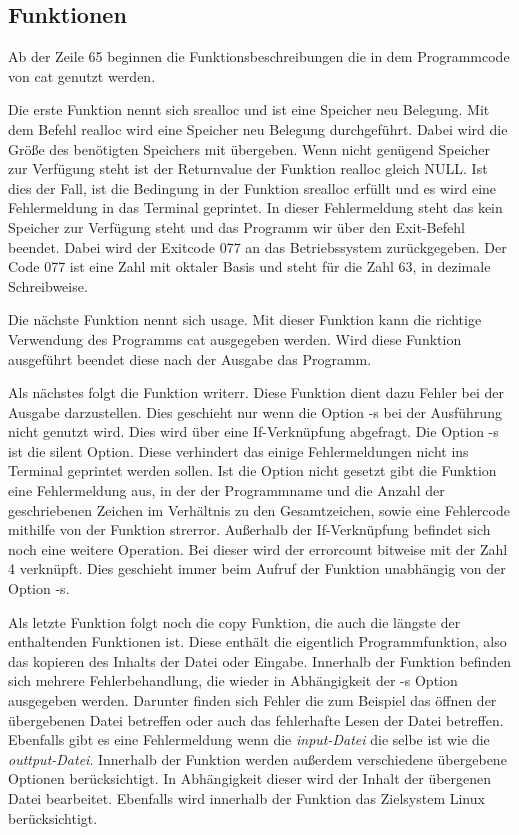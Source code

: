 {\subsection{Funktionen}
Ab der Zeile 65 beginnen die Funktionsbeschreibungen die in dem Programmcode von cat genutzt werden.\par
Die erste Funktion nennt sich srealloc und ist eine Speicher neu Belegung. Mit dem Befehl realloc wird eine Speicher neu Belegung durchgeführt.
Dabei wird die Größe des benötigten Speichers mit übergeben.
Wenn nicht genügend Speicher zur Verfügung steht ist der Returnvalue der Funktion realloc gleich NULL.
Ist dies der Fall, ist die Bedingung in der Funktion srealloc erfüllt und es wird eine Fehlermeldung in das Terminal geprintet.
In dieser Fehlermeldung steht das kein Speicher zur Verfügung steht und das Programm wir über den Exit-Befehl beendet.
Dabei wird der Exitcode 077 an das Betriebssystem zurückgegeben.
Der Code 077 ist eine Zahl mit oktaler Basis und steht für die Zahl 63, in dezimale Schreibweise.\par
Die nächste Funktion nennt sich usage.
Mit dieser Funktion kann die richtige Verwendung des Programms cat ausgegeben werden.
Wird diese Funktion ausgeführt beendet diese nach der Ausgabe das Programm.\par
Als nächstes folgt die Funktion writerr.
Diese Funktion dient dazu Fehler bei der Ausgabe darzustellen.
Dies geschieht nur wenn die Option -s bei der Ausführung nicht genutzt wird.
Dies wird über eine If-Verknüpfung abgefragt.
Die Option -s ist die silent Option.
Diese verhindert das einige Fehlermeldungen nicht ins Terminal geprintet werden sollen.
Ist die Option nicht gesetzt gibt die Funktion eine Fehlermeldung aus, in der der Programmname und die Anzahl der geschriebenen Zeichen im Verhältnis zu den Gesamtzeichen, sowie eine Fehlercode mithilfe von der Funktion strerror.
Außerhalb der If-Verknüpfung befindet sich noch eine weitere Operation.
Bei dieser wird der errorcount bitweise mit der Zahl 4 verknüpft.
Dies geschieht immer beim Aufruf der Funktion unabhängig von der Option -s.\par
Als letzte Funktion folgt noch die copy Funktion, die auch die längste der enthaltenden Funktionen ist.
Diese enthält die eigentlich Programmfunktion, also das kopieren des Inhalts der Datei oder Eingabe.
Innerhalb der Funktion befinden sich mehrere Fehlerbehandlung, die wieder in Abhängigkeit der -s Option ausgegeben werden.
Darunter finden sich Fehler die zum Beispiel das öffnen der übergebenen Datei betreffen oder auch das fehlerhafte Lesen der Datei betreffen.
Ebenfalls gibt es eine Fehlermeldung wenn die \textit{input-Datei} die selbe ist wie die \textit{outtput-Datei}.
Innerhalb der Funktion werden außerdem verschiedene übergebene Optionen berücksichtigt.
In Abhängigkeit dieser wird der Inhalt der übergenen Datei bearbeitet.
Ebenfalls wird innerhalb der Funktion das Zielsystem Linux berücksichtigt.

}

